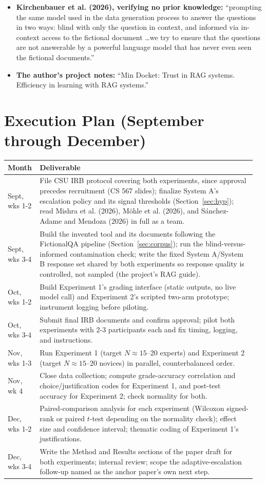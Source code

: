 \documentclass[9pt,conference]{IEEEtran}
\begin{document}
\begin{itemize}
  information.''
\item \textbf{Kirchenbauer et al. (2026), verifying no prior
  knowledge:} ``prompting the same model used in the data generation
  process to answer the questions in two ways: blind with only the
  question in context, and informed via in-context access to the
  fictional document \ldots we try to ensure that the questions are
  not answerable by a powerful language model that has never even
  seen the fictional documents.''
\item \textbf{The author's project notes:} ``Min Docket: Trust in RAG
  systems. Efficiency in learning with RAG systems.''
\end{itemize}

\section{Execution Plan (September through December)}
\small
\begin{tabular}{@{}p{0.11\linewidth}p{0.85\linewidth}@{}}
\toprule
\textbf{Month} & \textbf{Deliverable} \\
\midrule
Sept, wks 1-2 & File CSU IRB protocol covering both experiments, since
  approval precedes recruitment (CS 567 slides); finalize System A's
  escalation policy and its signal thresholds (Section~\ref{sec:hyp}); read
  Mishra et al. (2026), Möhle et al. (2026), and Sánchez-Adame and
  Mendoza (2026) in full as a team. \\
Sept, wks 3-4 & Build the invented tool and its documents following the
  FictionalQA pipeline (Section~\ref{sec:corpus}); run the
  blind-versus-informed contamination check; write the fixed System
  A/System B response set shared by both experiments so response
  quality is controlled, not sampled (the project's RAG guide). \\
Oct, wks 1-2 & Build Experiment 1's grading interface (static outputs,
  no live model call) and Experiment 2's scripted two-arm prototype;
  instrument logging before piloting. \\
Oct, wks 3-4 & Submit final IRB documents and confirm approval; pilot
  both experiments with 2-3 participants each and fix timing, logging,
  and instructions. \\
Nov, wks 1-3 & Run Experiment 1 (target $N \approx 15$--20 experts) and
  Experiment 2 (target $N \approx 15$--20 novices) in parallel,
  counterbalanced order. \\
Nov, wk 4 & Close data collection; compute grade-accuracy correlation
  and choice/justification codes for Experiment 1, and post-test
  accuracy for Experiment 2; check normality for both. \\
Dec, wks 1-2 & Paired-comparison analysis for each experiment (Wilcoxon
  signed-rank or paired $t$-test depending on the normality check);
  effect size and confidence interval; thematic coding of Experiment
  1's justifications. \\
Dec, wks 3-4 & Write the Method and Results sections of the paper
  draft for both experiments; internal review; scope the
  adaptive-escalation follow-up named as the anchor paper's own next
  step. \\
\bottomrule
\end{tabular}
\end{document}
